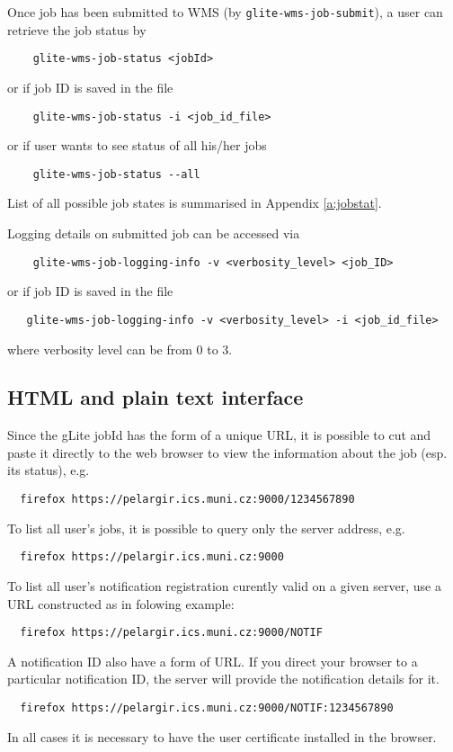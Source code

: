 Once job has been submitted to WMS (by \verb'glite-wms-job-submit'), 
a user can retrieve the job status by
\begin{verbatim}
    glite-wms-job-status <jobId>
\end{verbatim}
or if job ID is saved in the file
\begin{verbatim}
    glite-wms-job-status -i <job_id_file>
\end{verbatim}
or if user wants to see status of all his/her jobs
\begin{verbatim}
    glite-wms-job-status --all
\end{verbatim}
List of all possible job states is summarised in Appendix \ref{a:jobstat}.

Logging details on submitted job can be accessed via
\begin{verbatim}
    glite-wms-job-logging-info -v <verbosity_level> <job_ID>
\end{verbatim}
or if job ID is saved in the file
\begin{verbatim}
   glite-wms-job-logging-info -v <verbosity_level> -i <job_id_file>
\end{verbatim}
where verbosity level can be from 0 to 3. 







\subsection{HTML and plain text interface}
\label{simple}
Since the gLite jobId has the form of a unique URL, it is possible to cut and paste it directly
to the web browser to view the information about the job (esp. its status), e.g.
\begin{verbatim}
  firefox https://pelargir.ics.muni.cz:9000/1234567890
\end{verbatim}
To list all user's jobs, it is possible to query only the \LB server address, e.g.
\begin{verbatim}
  firefox https://pelargir.ics.muni.cz:9000
\end{verbatim}
To list all user's notification registration curently valid on a given \LB server, use a URL constructed as in folowing example:
\begin{verbatim}
  firefox https://pelargir.ics.muni.cz:9000/NOTIF
\end{verbatim}
A notification ID also have a form of URL. If you direct your browser to a particular notification ID, the \LB server will provide the notification details for it.
\begin{verbatim}
  firefox https://pelargir.ics.muni.cz:9000/NOTIF:1234567890
\end{verbatim}
In all cases it is necessary to have the user certificate installed in the browser.


